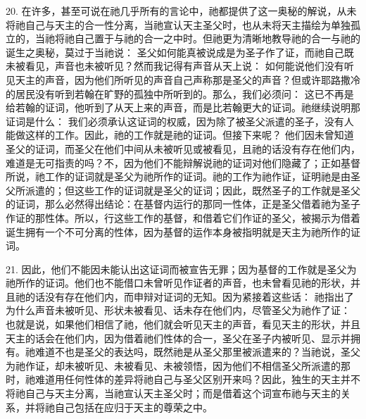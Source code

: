 20. 在许多，甚至可说在祂几乎所有的言论中，祂都提供了这一奥秘的解说，从未将祂自己与天主的合一性分离，当祂宣认天主圣父时，也从未将天主描绘为单独孤立的，当祂将祂自己置于与祂的合一之中时。但祂更为清晰地教导祂的合一与祂的诞生之奥秘，莫过于当祂说：  圣父如何能真被说成是为圣子作了证，而祂自己既未被看见，声音也未被听见？然而我记得有声音从天上说： 如何能说他们没有听见天主的声音，因为他们所听见的声音自己声称那是圣父的声音？但或许耶路撒冷的居民没有听到若翰在旷野的孤独中所听到的。那么，我们必须问： 这已不再是给若翰的证词，他听到了从天上来的声音，而是比若翰更大的证词。祂继续说明那证词是什么： 我们必须承认这证词的权威，因为除了被圣父派遣的圣子，没有人能做这样的工作。因此，祂的工作就是祂的证词。但接下来呢？ 他们因未曾知道圣父的证词，而圣父在他们中间从未被听见或被看见，且祂的话没有存在他们内，难道是无可指责的吗？不，因为他们不能辩解说祂的证词对他们隐藏了；正如基督所说，祂工作的证词就是圣父为祂所作的证词。祂的工作为祂作证，证明祂是由圣父所派遣的；但这些工作的证词就是圣父的证词；因此，既然圣子的工作就是圣父的证词，那么必然得出结论：在基督内运行的那同一性体，正是圣父借着祂为圣子作证的那性体。所以，行这些工作的基督，和借着它们作证的圣父，被揭示为借着诞生拥有一个不可分离的性体，因为基督的运作本身被指明就是天主为祂所作的证词。\par

21. 因此，他们不能因未能认出这证词而被宣告无罪；因为基督的工作就是圣父为祂所作的证词。他们也不能借口未曾听见作证者的声音，也未曾看见祂的形状，并且祂的话没有存在他们内，而申辩对证词的无知。因为紧接着这些话： 祂指出了为什么声音未被听见、形状未被看见、话未存在他们内，尽管圣父为祂作了证： 也就是说，如果他们相信了祂，他们就会听见天主的声音，看见天主的形状，并且天主的话会在他们内，因为借着祂们性体的合一，圣父在圣子内被听见、显示并拥有。祂难道不也是圣父的表达吗，既然祂是从圣父那里被派遣来的？当祂说，圣父为祂作证，却未被听见、未被看见、未被领悟，因为他们不相信圣父所派遣的那时，祂难道用任何性体的差异将祂自己与圣父区别开来吗？因此，独生的天主并不将祂自己与天主分离，当祂宣认天主圣父时；而是借着这个词宣布祂与天主的关系，并将祂自己包括在应归于天主的尊荣之中。\par

